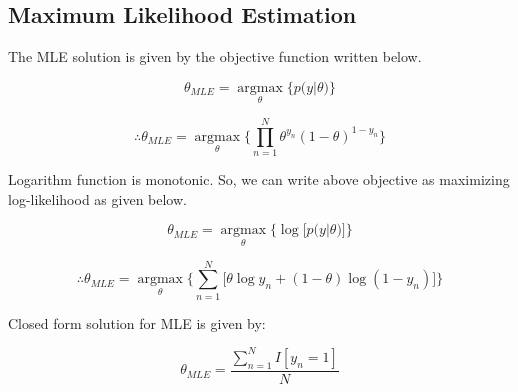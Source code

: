 \subsection{Maximum Likelihood Estimation}

The MLE solution is given by the objective function written below.

\begin{equation*}
    \theta_{MLE} 
    =
    \operatorname*{argmax}_\theta \bigg\{ p\big(y | \theta\big) \bigg\}
\end{equation*}

\begin{equation}
    \therefore
    \theta_{MLE} 
    =
    \operatorname*{argmax}_\theta 
    \bigg\{ \prod_{n=1}^{N} \theta ^ {y_n} (1 - \theta)^{1 - y_n} \bigg\}
\end{equation}

\medspace

Logarithm function is monotonic. So, we can write above objective as maximizing log-likelihood as given below.

\begin{equation*}
    \theta_{MLE} 
    = 
    \operatorname*{argmax}_\theta
    \bigg\{ \log{ \Big[ p\big(y | \theta\big) \Big] \bigg\}}
\end{equation*}

\begin{equation}
    \therefore
    \theta_{MLE} 
    =
    \operatorname*{argmax}_\theta
    \bigg\{ \sum_{n=1}^{N} \Big[ \theta \log {y_n} + (1 - \theta) \log{(1 - y_n)} \Big] \bigg\} 
\end{equation}

\medspace

Closed form solution for MLE is given by:

\begin{equation}
\boxed{
    \boxed{
        \theta_{MLE} = \frac{\sum_{n=1}^{N} I[y_n = 1]}{N}
    }
}
\end{equation}